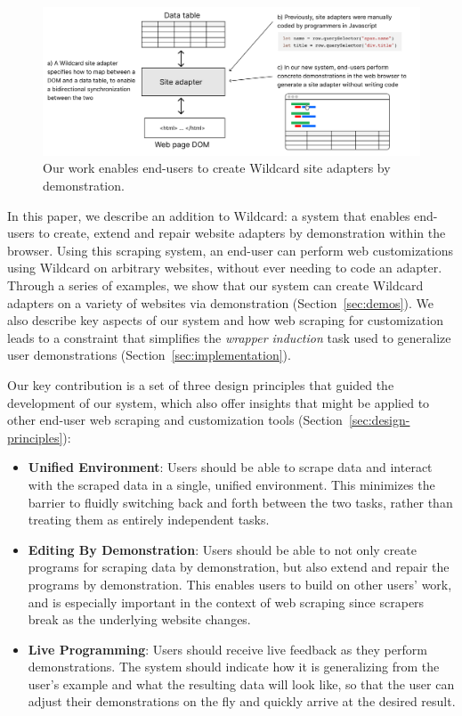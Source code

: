 \documentclass[sigconf,10pt]{acmart}
\providecommand{\tightlist}{%
  \setlength{\itemsep}{0pt}\setlength{\parskip}{0pt}}
\begin{document}
\begin{figure}
  \includegraphics[width=\textwidth]{media/overview.png}
  \caption{\label{fig:overview}Our work enables end-users to create Wildcard site adapters by demonstration.}
\end{figure}

In this paper, we describe an addition to Wildcard: a system that
enables end-users to create, extend and repair website adapters by
demonstration within the browser. Using this scraping system, an
end-user can perform web customizations using Wildcard on arbitrary
websites, without ever needing to code an adapter. Through a series of
examples, we show that our system can create Wildcard adapters on a
variety of websites via demonstration (Section~\ref{sec:demos}). We also
describe key aspects of our system and how web scraping for
customization leads to a constraint that simplifies the \emph{wrapper
induction} \citep{kushmerick2000} task used to generalize user
demonstrations (Section~\ref{sec:implementation}).

Our key contribution is a set of three design principles that guided the
development of our system, which also offer insights that might be
applied to other end-user web scraping and customization tools
(Section~\ref{sec:design-principles}):

\begin{itemize}
\tightlist
\item
  \textbf{Unified Environment}: Users should be able to scrape data and
  interact with the scraped data in a single, unified environment. This
  minimizes the barrier to fluidly switching back and forth between the
  two tasks, rather than treating them as entirely independent tasks.
\item
  \textbf{Editing By Demonstration}: Users should be able to not only
  create programs for scraping data by demonstration, but also extend
  and repair the programs by demonstration. This enables users to build
  on other users' work, and is especially important in the context of
  web scraping since scrapers break as the underlying website changes.
\item
  \textbf{Live Programming}: Users should receive live feedback as they
  perform demonstrations. The system should indicate how it is
  generalizing from the user's example and what the resulting data will
  look like, so that the user can adjust their demonstrations on the fly
  and quickly arrive at the desired result.
\end{itemize}
\end{document}
